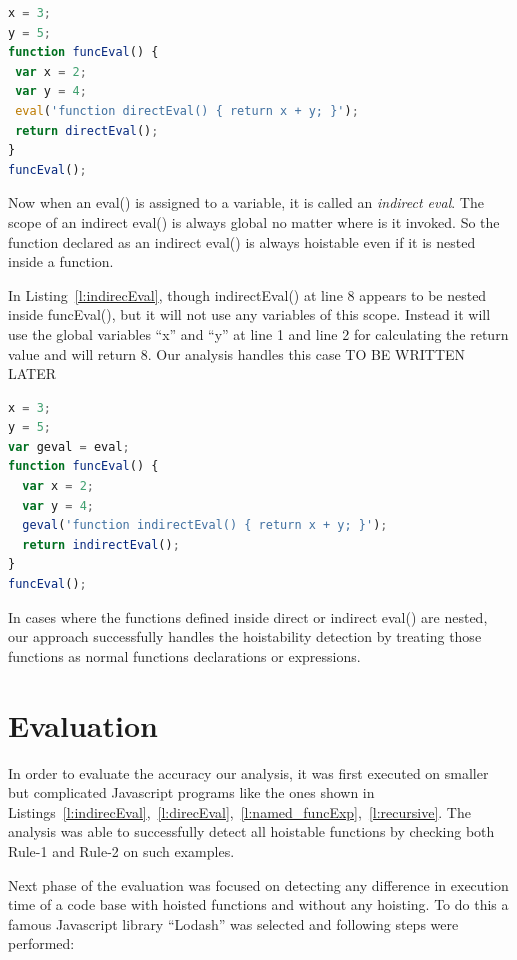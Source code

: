 \documentclass[authoryear,preprint]{sigplanconf}
\begin{document}
\lstset{numbers=left, numberstyle=\tiny, stepnumber=1, numbersep=5pt}
\lstset{basicstyle=\ttfamily}
\lstset{frame=tb, frame=bottomline}

\begin{lstlisting}[float,caption=Direct eval() ,label=l:direcEval,language=JavaScript]
x = 3;
y = 5;
function funcEval() {
 var x = 2;
 var y = 4;
 eval('function directEval() { return x + y; }');
 return directEval();
}
funcEval();
\end{lstlisting}

Now when an eval() is assigned to a variable, it is called an \textit{indirect eval}. The scope of an indirect eval() is always global no matter where is it invoked. So the function declared as an indirect eval() is always hoistable even if it is nested inside a function.\par

In Listing~\ref{l:indirecEval}, though indirectEval() at line 8 appears to be nested inside funcEval(), but it will not use any variables of this scope. Instead it will use the global variables \enquote{x} and \enquote{y} at line 1 and line 2 for calculating the return value and will return 8. Our analysis handles this case TO BE WRITTEN LATER

\lstset{numbers=left, numberstyle=\tiny, stepnumber=1, numbersep=5pt}
\lstset{basicstyle=\ttfamily}
\lstset{frame=tb, frame=bottomline}

\begin{lstlisting}[float,caption=InDirect eval() ,label=l:indirecEval,language=JavaScript]
x = 3;
y = 5;
var geval = eval;
function funcEval() {
  var x = 2;
  var y = 4;
  geval('function indirectEval() { return x + y; }');
  return indirectEval();
}
funcEval();
\end{lstlisting}

In cases where the functions defined inside direct or indirect eval() are nested, our approach successfully handles the hoistability detection by treating those functions as normal functions declarations or expressions.

\section{Evaluation}
\label{sec:evaluation}

In order to evaluate the accuracy our analysis, it was first executed on smaller but complicated Javascript programs like the ones shown in Listings~\ref{l:indirecEval},~\ref{l:direcEval},~\ref{l:named_funcExp},~\ref{l:recursive}. The analysis was able to successfully detect all hoistable functions by checking both Rule-1 and Rule-2 on such examples. \par
Next phase of the evaluation was focused on detecting any difference in execution time of a code base with hoisted functions and without any hoisting. To do this a famous Javascript library \enquote{Lodash} was selected and following steps were performed:
\end{document}
